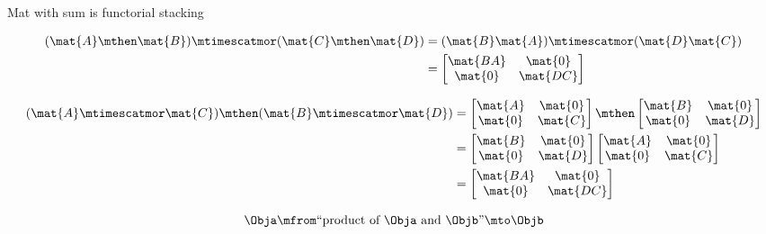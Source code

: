 {\begin{forslides}
        Mat with sum is functorial stacking

        \begin{align}\label{eq:parallelism-056}
            (\mat{A} \mthen \mat{B}) \mtimescatmor (\mat{C} \mthen \mat{D}) & = (\mat{B}\mat{A}) \mtimescatmor (\mat{D}\mat{C}) \\
                                                                            & =
            \begin{bmatrix}
                \mat{BA} & \mat{0}  \\
                \mat{0}  & \mat{DC}
            \end{bmatrix}
        \end{align}

        \begin{align}\label{eq:parallelism-057}
            (\mat{A} \mtimescatmor \mat{C}) \mthen (\mat{B} \mtimescatmor \mat{D}) & =
            \begin{bmatrix}
                \mat{A} & \mat{0} \\
                \mat{0} & \mat{C}
            \end{bmatrix}
            \mthen
            \begin{bmatrix}
                \mat{B} & \mat{0} \\
                \mat{0} & \mat{D}
            \end{bmatrix} \\
                                                                                   & =
            \begin{bmatrix}
                \mat{B} & \mat{0} \\
                \mat{0} & \mat{D}
            \end{bmatrix}
            \begin{bmatrix}
                \mat{A} & \mat{0} \\
                \mat{0} & \mat{C}
            \end{bmatrix} \\
                                                                                   & =
            \begin{bmatrix}
                \mat{BA} & \mat{0}  \\
                \mat{0}  & \mat{DC}
            \end{bmatrix}
        \end{align}

        \begin{equation}
            \label{eq:parallelism-058}
            \Obja \mfrom \text{``product of } \Obja \text{ and } \Objb \text{''} \mto \Objb
        \end{equation}


\end{forslides}}
